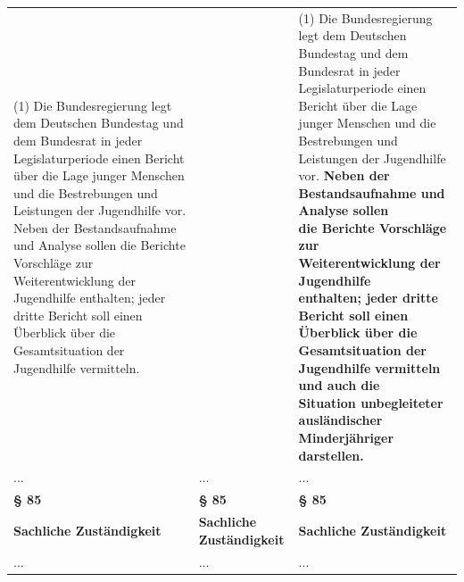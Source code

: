 \documentclass[10pt,a4paper,landscape]{article}
\begin{document}
\begin{longtable}{|L{8.2cm}|L{8.2cm}|L{8.2cm}|}
(1) Die Bundesregierung legt dem  \newline Deutschen Bundestag und dem Bundesrat  \newline in jeder Legislaturperiode einen Bericht  \newline über die Lage junger Menschen und die  \newline Bestrebungen und Leistungen der  \newline Jugendhilfe vor. Neben der  \newline Bestandsaufnahme und Analyse sollen die  \newline Berichte Vorschläge zur Weiterentwicklung  \newline der Jugendhilfe enthalten; jeder dritte  \newline Bericht soll einen Überblick über die  \newline Gesamtsituation der Jugendhilfe \textcolor{diffred}{vermitteln.} &  & (1) Die Bundesregierung legt dem  \newline Deutschen Bundestag und dem Bundesrat  \newline in jeder Legislaturperiode einen Bericht  \newline über die Lage junger Menschen und die  \newline Bestrebungen und Leistungen der  \newline Jugendhilfe vor. \textbf{Neben der  \newline Bestandsaufnahme und Analyse sollen  \newline die Berichte Vorschläge zur  \newline Weiterentwicklung der Jugendhilfe  \newline enthalten; jeder dritte Bericht soll einen  \newline Überblick über die Gesamtsituation der  \newline Jugendhilfe }\textbf{\textcolor{diffgreen}{vermitteln und auch die  \newline Situation unbegleiteter ausländischer  \newline Minderjähriger darstellen.}} \\
\hhline{|---|}
... & ... & ... \\
\hhline{|---|}
\textbf{\S{} 85} & \textbf{\S{} 85} & \textbf{\S{} 85} \\
\hhline{|---|}
\textbf{Sachliche Zuständigkeit} & \textbf{Sachliche Zuständigkeit} & \textbf{Sachliche Zuständigkeit} \\
\hhline{|---|}
... & ... & ... \\

\end{longtable}
\end{document}
